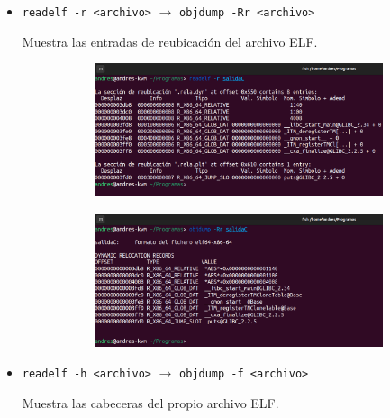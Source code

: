 \documentclass{article}
\begin{document}
\begin{itemize}
    \item \verb|readelf -r <archivo>| $\rightarrow$ \verb|objdump -Rr <archivo>|
    
    
    Muestra las entradas de reubicación del archivo ELF.

    \begin{figure}[H]
        \centering
        \begin{subfigure}{0.49\textwidth}
            \centering
            \includegraphics[width=\textwidth]{imagenes/Captura desde 2022-11-17 17-42-30.png}
        \end{subfigure}
        \hfill
        \begin{subfigure}{0.49\textwidth}
            \centering
            \includegraphics[width=\textwidth]{imagenes/Captura desde 2022-11-17 17-42-36.png}
        \end{subfigure}
    \end{figure}

    \item \verb|readelf -h <archivo>| $\rightarrow$ \verb|objdump -f <archivo>|
    
    Muestra las cabeceras del propio archivo ELF.


\end{itemize}
\end{document}
